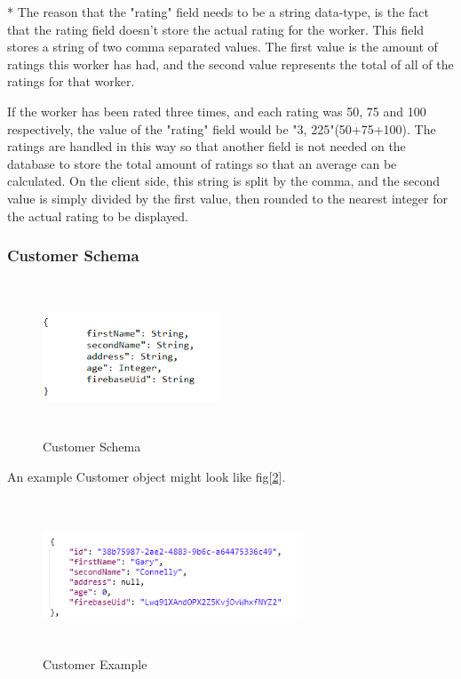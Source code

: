 * The reason that the "rating" field needs to be a string data-type, is the fact that the rating field doesn't store the actual rating for the worker. This field stores a string of two comma separated values. The first value is the amount of ratings this worker has had, and the second value represents the total of all of the ratings for that worker. 

If the worker has been rated three times, and each rating was 50, 75 and 100 respectively, the value of the "rating" field would be "3, 225"(50+75+100). The ratings are handled in this way so that another field is not needed on the database to store the total amount of ratings so that an average can be calculated. On the client side, this string is split by the comma, and the second value is simply divided by the first value, then rounded to the nearest integer for the actual rating to be displayed.
\bigskip

\subsubsection{Customer Schema}
\label{sec:SystemDesignCustomerSchema}

\begin{figure}[H]
    \centering
    \includegraphics[width=150pt, height=130pt]{DesignImages/CustomerSchema.PNG}
    \caption{Customer Schema}
    \label{fig:my_label}
\end{figure}

\bigskip

An example Customer object might look like fig[\ref{fig:customerExample}].

\begin{figure}[H]
    \centering
    \includegraphics[width=220pt, height=130pt]{DesignImages/CustomerObject.PNG}
    \caption{Customer Example}
    \label{fig:customerExample}
\end{figure}

